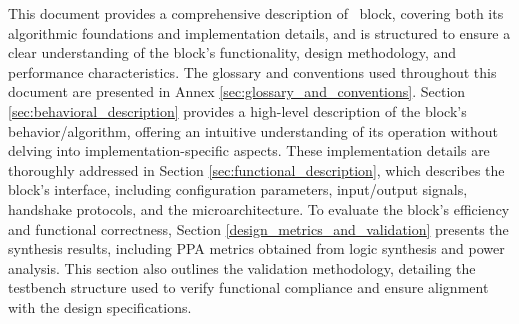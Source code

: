 
This document provides a comprehensive description of \blockname\ block, covering both its algorithmic foundations and implementation details, and is structured to ensure a clear understanding of the block’s functionality, design methodology, and performance characteristics. The glossary and conventions used throughout this document are presented in Annex \ref{sec:glossary_and_conventions}. Section \ref{sec:behavioral_description} provides a high-level description of the block’s behavior/algorithm, offering an intuitive understanding of its operation without delving into implementation-specific aspects. These implementation details are thoroughly addressed in Section \ref{sec:functional_description}, which describes the block’s interface, including configuration parameters, input/output signals, handshake protocols, and the microarchitecture. To evaluate the block’s efficiency and functional correctness, Section \ref{design_metrics_and_validation} presents the synthesis results, including PPA metrics obtained from logic synthesis and power analysis. This section also outlines the validation methodology, detailing the testbench structure used to verify functional compliance and ensure alignment with the design specifications.
